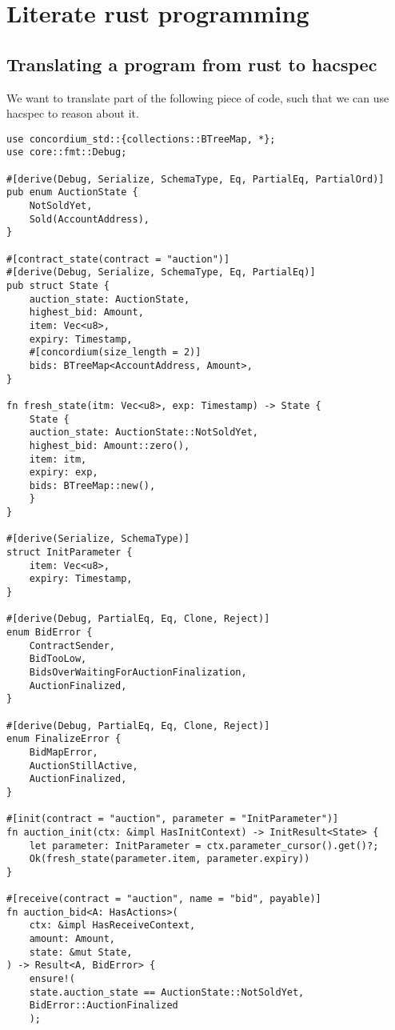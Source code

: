 \documentclass[11pt]{article}
\author{Lasse Letager Hansen}
\date{\today}
\title{}
\begin{document}
\tableofcontents


\section{Literate rust programming}
\label{sec:orgce0736d}

\subsection{Translating a program from rust to hacspec}
\label{sec:org8378fea}
We want to translate part of the following piece of code, such that we can use hacspec to reason about it.
\begin{verbatim}
use concordium_std::{collections::BTreeMap, *};
use core::fmt::Debug;

#[derive(Debug, Serialize, SchemaType, Eq, PartialEq, PartialOrd)]
pub enum AuctionState {
    NotSoldYet,
    Sold(AccountAddress),
}

#[contract_state(contract = "auction")]
#[derive(Debug, Serialize, SchemaType, Eq, PartialEq)]
pub struct State {
    auction_state: AuctionState,
    highest_bid: Amount,
    item: Vec<u8>,
    expiry: Timestamp,
    #[concordium(size_length = 2)]
    bids: BTreeMap<AccountAddress, Amount>,
}

fn fresh_state(itm: Vec<u8>, exp: Timestamp) -> State {
    State {
	auction_state: AuctionState::NotSoldYet,
	highest_bid: Amount::zero(),
	item: itm,
	expiry: exp,
	bids: BTreeMap::new(),
    }
}

#[derive(Serialize, SchemaType)]
struct InitParameter {
    item: Vec<u8>,
    expiry: Timestamp,
}

#[derive(Debug, PartialEq, Eq, Clone, Reject)]
enum BidError {
    ContractSender,
    BidTooLow,
    BidsOverWaitingForAuctionFinalization,
    AuctionFinalized,
}

#[derive(Debug, PartialEq, Eq, Clone, Reject)]
enum FinalizeError {
    BidMapError,
    AuctionStillActive,
    AuctionFinalized,
}

#[init(contract = "auction", parameter = "InitParameter")]
fn auction_init(ctx: &impl HasInitContext) -> InitResult<State> {
    let parameter: InitParameter = ctx.parameter_cursor().get()?;
    Ok(fresh_state(parameter.item, parameter.expiry))
}

#[receive(contract = "auction", name = "bid", payable)]
fn auction_bid<A: HasActions>(
    ctx: &impl HasReceiveContext,
    amount: Amount,
    state: &mut State,
) -> Result<A, BidError> {
    ensure!(
	state.auction_state == AuctionState::NotSoldYet,
	BidError::AuctionFinalized
    );


\end{verbatim}
\end{document}
